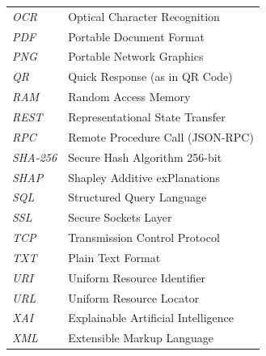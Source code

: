 \begin{longtable}[l]{p{80pt}p{300pt}}
\emph{OCR}        & Optical Character Recognition\\
\emph{PDF}        & Portable Document Format\\
\emph{PNG}        & Portable Network Graphics\\
\emph{QR}         & Quick Response (as in QR Code)\\
\emph{RAM}        & Random Access Memory\\
\emph{REST}       & Representational State Transfer\\
\emph{RPC}        & Remote Procedure Call (JSON-RPC)\\
\emph{SHA-256}    & Secure Hash Algorithm 256-bit\\
\emph{SHAP}       & Shapley Additive exPlanations\\
\emph{SQL}        & Structured Query Language\\
\emph{SSL}        & Secure Sockets Layer\\
\emph{TCP}        & Transmission Control Protocol\\
\emph{TXT}        & Plain Text Format\\
\emph{URI}        & Uniform Resource Identifier\\
\emph{URL}        & Uniform Resource Locator\\
\emph{XAI}        & Explainable Artificial Intelligence\\
\emph{XML}        & Extensible Markup Language\\

\end{longtable}
